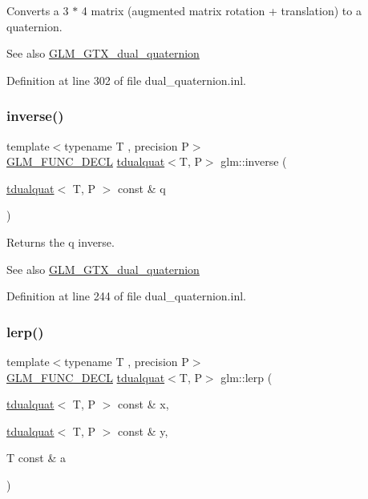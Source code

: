 Converts a 3 $\ast$ 4 matrix (augmented matrix rotation + translation) to a quaternion.

\begin{DoxySeeAlso}{See also}
\mbox{\hyperlink{group__gtx__dual__quaternion}{G\+L\+M\+\_\+\+G\+T\+X\+\_\+dual\+\_\+quaternion}} 
\end{DoxySeeAlso}


Definition at line 302 of file dual\+\_\+quaternion.\+inl.

\mbox{\label{group__gtx__dual__quaternion_ga2149d3cb8af04d9530de0cd16aa1aab2}} 
\subsubsection{\texorpdfstring{inverse()}{inverse()}}
{\footnotesize\ttfamily template$<$typename T , precision P$>$ \\
\mbox{\hyperlink{setup_8hpp_ab2d052de21a70539923e9bcbf6e83a51}{G\+L\+M\+\_\+\+F\+U\+N\+C\+\_\+\+D\+E\+CL}} \mbox{\hyperlink{structglm_1_1tdualquat}{tdualquat}}$<$T, P$>$ glm\+::inverse (\begin{DoxyParamCaption}\item[{\mbox{\hyperlink{structglm_1_1tdualquat}{tdualquat}}$<$ T, P $>$ const \&}]{q }\end{DoxyParamCaption})}

Returns the q inverse.

\begin{DoxySeeAlso}{See also}
\mbox{\hyperlink{group__gtx__dual__quaternion}{G\+L\+M\+\_\+\+G\+T\+X\+\_\+dual\+\_\+quaternion}} 
\end{DoxySeeAlso}


Definition at line 244 of file dual\+\_\+quaternion.\+inl.

\mbox{\label{group__gtx__dual__quaternion_ga8039b88397ca09275be924a26a806a59}} 
\subsubsection{\texorpdfstring{lerp()}{lerp()}}
{\footnotesize\ttfamily template$<$typename T , precision P$>$ \\
\mbox{\hyperlink{setup_8hpp_ab2d052de21a70539923e9bcbf6e83a51}{G\+L\+M\+\_\+\+F\+U\+N\+C\+\_\+\+D\+E\+CL}} \mbox{\hyperlink{structglm_1_1tdualquat}{tdualquat}}$<$T, P$>$ glm\+::lerp (\begin{DoxyParamCaption}\item[{\mbox{\hyperlink{structglm_1_1tdualquat}{tdualquat}}$<$ T, P $>$ const \&}]{x,  }\item[{\mbox{\hyperlink{structglm_1_1tdualquat}{tdualquat}}$<$ T, P $>$ const \&}]{y,  }\item[{T const \&}]{a }\end{DoxyParamCaption})}

